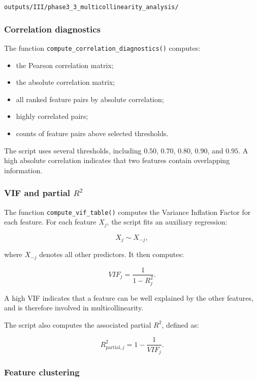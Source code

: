 \documentclass{ipgpmaster}
\begin{document}
\begin{center}
\texttt{outputs/III/phase3\_3\_multicollinearity\_analysis/}
\end{center}

\subsubsection{Correlation diagnostics}

The function \texttt{compute\_correlation\_diagnostics()} computes:

\begin{itemize}
    \item the Pearson correlation matrix;
    \item the absolute correlation matrix;
    \item all ranked feature pairs by absolute correlation;
    \item highly correlated pairs;
    \item counts of feature pairs above selected thresholds.
\end{itemize}

The script uses several thresholds, including \(0.50\), \(0.70\), \(0.80\), \(0.90\), and \(0.95\). A high absolute correlation indicates that two features contain overlapping information.

\subsubsection{VIF and partial \(R^2\)}

The function \texttt{compute\_vif\_table()} computes the Variance Inflation Factor for each feature. For each feature \(X_j\), the script fits an auxiliary regression:

\[
X_j \sim X_{-j},
\]

where \(X_{-j}\) denotes all other predictors. It then computes:

\[
VIF_j = \frac{1}{1 - R_j^2}.
\]

A high VIF indicates that a feature can be well explained by the other features, and is therefore involved in multicollinearity.

The script also computes the associated partial \(R^2\), defined as:

\[
R^2_{\text{partial},j} = 1 - \frac{1}{VIF_j}.
\]

\subsubsection{Feature clustering}
\end{document}
